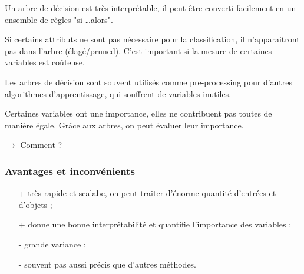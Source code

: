 	Un arbre de décision est très interprétable, il peut être converti facilement en un ensemble de règles "si \dots alors".
	
	Si certains attributs ne sont pas nécessaire pour la classification, il n'apparaitront pas dans l'arbre (élagé/pruned). C'est important si la mesure de certaines variables est coûteuse.
	
	Les arbres de décision sont souvent utilisés comme pre-processing pour d'autres algorithmes d'apprentissage, qui souffrent de variables inutiles.
	
	Certaines variables ont une importance, elles ne contribuent pas toutes de manière égale. Grâce aux arbres, on peut évaluer leur importance.
	
	$\longrightarrow$ Comment ?
	
	\subsubsection{Avantages et inconvénients}
	
	\begin{itemize}
		\item[+] très rapide et scalabe, on peut traiter d'énorme quantité d'entrées et d'objets ;
		\item[+] donne une bonne interprétabilité et quantifie l'importance des variables ;
		\item[-] grande variance ;
		\item[-] souvent pas aussi précis que d'autres méthodes.
	\end{itemize}
	